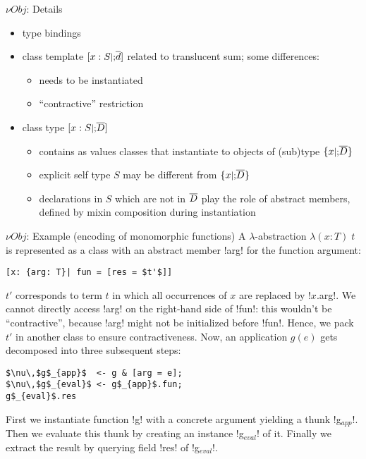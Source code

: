 \documentclass{beamer}
\begin{document}
\begin{frame}{${\nu}Obj$: Details}
\begin{itemize}
\item type bindings
\item class template $[x: S \mbox{\small $|;$} \overline d]$ related to translucent sum; some differences:
\begin{itemize}
\item needs to be instantiated
\item ``contractive'' restriction
\end{itemize}
\item class type $[x: S \mbox{\small $|;$} \overline D]$
\begin{itemize}
\item contains as values classes that instantiate to objects of (sub)type $\{x \mbox{\small $|;$} \overline D\}$
\item explicit self type $S$ may be different from $\{x \mbox{\small $|;$} \overline D\}$
\item declarations in $S$ which are not in $\overline D$ play the role of abstract members, defined by mixin composition during instantiation
\end{itemize}
\end{itemize}
\end{frame}

\begin{frame}[fragile]{${\nu}Obj$: Example (encoding of monomorphic functions)}
A $\lambda$-abstraction $\lambda ( x : T )\; t$ is represented as a
class with an abstract member \code!arg! for the function argument:
\begin{lstlisting}
[x: {arg: T}| fun = [res = $t'$]]
\end{lstlisting}
$t'$ corresponds to term $t$ in which all occurrences of $x$ are
replaced by \code!$x$.arg!. We cannot directly access \code!arg! on
the right-hand side of \code!fun!: this wouldn't be ``contractive'',
because \code!arg! might not be initialized before \code!fun!. Hence,
we pack $t'$ in another class to ensure contractiveness. Now, an
application $g(e)$ gets decomposed into three subsequent steps:
\begin{lstlisting}
$\nu\,$g$_{app}$  <- g & [arg = e];
$\nu\,$g$_{eval}$ <- g$_{app}$.fun;
g$_{eval}$.res
\end{lstlisting}
First we instantiate function \code!g! with a concrete argument
yielding a thunk \code!g$_{app}$!. Then we evaluate this thunk by
creating an instance \code!g$_{eval}$! of it. Finally we extract the
result by querying field \code!res! of \code!g$_{eval}$!.
\end{frame}
\end{document}
